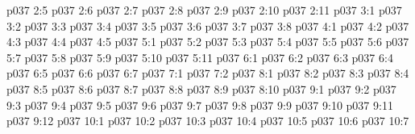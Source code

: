 \vs p037 2:5 
\vs p037 2:6 \pc 
\vs p037 2:7 
\vs p037 2:8 
\vs p037 2:9 
\vs p037 2:10 \pc 
\vs p037 2:11 
\vs p037 3:1 
\vs p037 3:2 
\vs p037 3:3 \pc 
\vs p037 3:4 
\vs p037 3:5 \pc 
\vs p037 3:6 
\vs p037 3:7 \pc 
\vs p037 3:8 
\vs p037 4:1 
\vs p037 4:2 
\vs p037 4:3 
\vs p037 4:4 
\vs p037 4:5 
\vs p037 5:1 
\vs p037 5:2 
\vs p037 5:3 
\vs p037 5:4 \pc 
\vs p037 5:5 
\vs p037 5:6 
\vs p037 5:7 
\vs p037 5:8 
\vs p037 5:9 
\vs p037 5:10 \pc 
\vs p037 5:11 
\vs p037 6:1 
\vs p037 6:2 
\vs p037 6:3 \pc 
\vs p037 6:4 
\vs p037 6:5 \pc 
\vs p037 6:6 
\vs p037 6:7 \pc 
{}
\vs p037 7:1 
\vs p037 7:2 
\vs p037 8:1 
\vs p037 8:2 \pc 
\vs p037 8:3 
\vs p037 8:4 
\vs p037 8:5 
\vs p037 8:6 
\vs p037 8:7 
\vs p037 8:8 
\vs p037 8:9 
\vs p037 8:10 \pc 
{}
\vs p037 9:1 
\vs p037 9:2 
\vs p037 9:3 
\vs p037 9:4 
\vs p037 9:5 
\vs p037 9:6 \pc 
\vs p037 9:7 \pc 
\vs p037 9:8 \pc 
\vs p037 9:9 \pc 
\vs p037 9:10 
\vs p037 9:11 \pc 
\vs p037 9:12 \pc 
{}
\vs p037 10:1 
\vs p037 10:2 \pc 
\vs p037 10:3 \pc 
\vs p037 10:4 \pc 
\vs p037 10:5 
\vs p037 10:6 
\vsetoff
\vs p037 10:7 
\quizlink
